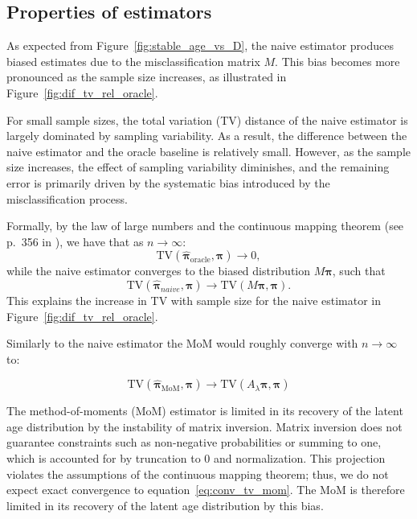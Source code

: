 \documentclass[11pt,a4paper]{article}
\begin{document}
\subsection{Properties of estimators}

As expected from Figure~\ref{fig:stable_age_vs_D}, the naive estimator produces biased estimates due to the misclassification matrix $M$. This bias becomes more pronounced as the sample size increases, as illustrated in Figure~\ref{fig:dif_tv_rel_oracle}.

For small sample sizes, the total variation (TV) distance of the naive estimator is largely dominated by sampling variability. As a result, the difference between the naive estimator and the oracle baseline is relatively small. However, as the sample size increases, the effect of sampling variability diminishes, and the remaining error is primarily driven by the systematic bias introduced by the misclassification process.

Formally, by the law of large numbers and the continuous mapping theorem (see p.~356 in \cite{robert2007}), we have that as $n \to \infty$:
\[
\mathrm{TV}(\hat{\boldsymbol{\pi}}_{\text{oracle}}, \boldsymbol{\pi}) \to 0,
\]
while the naive estimator converges to the biased distribution $M\boldsymbol{\pi}$, such that
\[
\mathrm{TV}(\hat{\boldsymbol{\pi}}_{naive}, \boldsymbol{\pi}) \to \mathrm{TV}(M\boldsymbol{\pi}, \boldsymbol{\pi}).
\]
This explains the increase in TV with sample size for the naive estimator in Figure~\ref{fig:dif_tv_rel_oracle}.

Similarly to the naive estimator the MoM would roughly converge with $n \to \infty$ to:

\begin{equation}
\mathrm{TV}(\hat{\boldsymbol{\pi}}_{\mathrm{MoM}}, \boldsymbol{\pi})
\to
\mathrm{TV}(A_\lambda \boldsymbol{\pi}, \boldsymbol{\pi})
\label{eq:conv_tv_mom}
\end{equation} 

The method-of-moments (MoM) estimator is limited in its recovery of the latent age distribution by the instability of matrix inversion. Matrix inversion does not guarantee constraints such as non-negative probabilities or summing to one, which is accounted for by truncation to 0 and normalization. This projection violates the assumptions of the continuous mapping theorem; thus, we do not expect exact convergence to equation~\eqref{eq:conv_tv_mom}. The MoM is therefore limited in its recovery of the latent age distribution by this bias.
\end{document}
